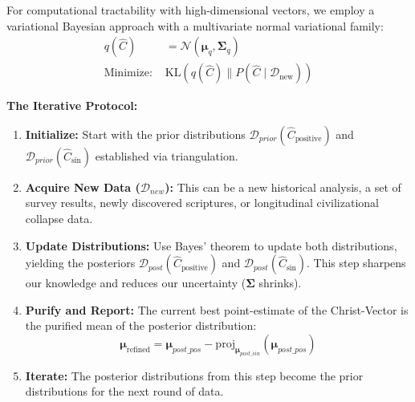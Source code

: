 \documentclass[11pt,a4paper]{article}
\theoremstyle{definition}
\theoremstyle{remark}
\begin{document}
\begin{small}
For computational tractability with high-dimensional vectors, we employ a variational Bayesian approach with a multivariate normal variational family:
\begin{align}
q(\hat{C}) &= \mathcal{N}(\boldsymbol{\mu}_q, \boldsymbol{\Sigma}_q) \\
\text{Minimize: } &\text{KL}(q(\hat{C}) \parallel P(\hat{C} \mid \mathcal{D}_{\text{new}}))
\end{align}

\textbf{The Iterative Protocol:}
\begin{enumerate}
    \item \textbf{Initialize:} Start with the prior distributions \(\mathcal{D}_{prior}(\hat{C}_{\text{positive}})\) and \(\mathcal{D}_{prior}(\hat{C}_{\text{sin}})\) established via triangulation.
    
    \item \textbf{Acquire New Data (\(\mathcal{D}_{new}\)):} This can be a new historical analysis, a set of survey results, newly discovered scriptures, or longitudinal civilizational collapse data.
    
    \item \textbf{Update Distributions:} Use Bayes' theorem to update both distributions, yielding the posteriors \(\mathcal{D}_{post}(\hat{C}_{\text{positive}})\) and \(\mathcal{D}_{post}(\hat{C}_{\text{sin}})\). This step sharpens our knowledge and reduces our uncertainty (\(\boldsymbol{\Sigma}\) shrinks).
    
    \item \textbf{Purify and Report:} The current best point-estimate of the Christ-Vector is the purified mean of the posterior distribution:
    \begin{equation}
    \boldsymbol{\mu}_{\text{refined}} = \boldsymbol{\mu}_{post\_pos} - \text{proj}_{\boldsymbol{\mu}_{post\_sin}}(\boldsymbol{\mu}_{post\_pos})
    \end{equation}
    
    \item \textbf{Iterate:} The posterior distributions from this step become the prior distributions for the next round of data.
\end{enumerate}


\end{small}
\end{document}
